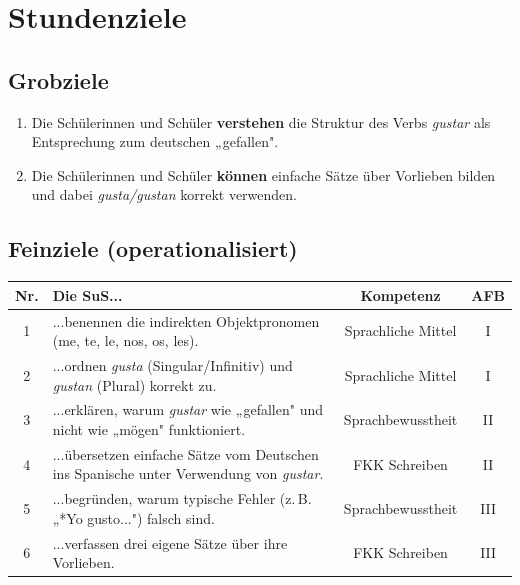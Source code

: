 \documentclass[11pt, a4paper]{article}
\newcommand{\es}[1]{\textcolor{spanisch}{\textit{#1}}}
\begin{document}

\section{Stundenziele}

\subsection{Grobziele}

\begin{enumerate}[leftmargin=2em]
    \item Die Schülerinnen und Schüler \textbf{verstehen} die Struktur des Verbs \es{gustar} als Entsprechung zum deutschen „gefallen".
    \item Die Schülerinnen und Schüler \textbf{können} einfache Sätze über Vorlieben bilden und dabei \es{gusta/gustan} korrekt verwenden.
\end{enumerate}

\subsection{Feinziele (operationalisiert)}

\begin{center}
\small
\begin{tabularx}{\textwidth}{|c|X|c|c|}
    \hline
    \textbf{Nr.} & \textbf{Die SuS...} & \textbf{Kompetenz} & \textbf{AFB} \\
    \hline
    1 & ...benennen die indirekten Objektpronomen (me, te, le, nos, os, les). & Sprachliche Mittel & I \\
    \hline
    2 & ...ordnen \es{gusta} (Singular/Infinitiv) und \es{gustan} (Plural) korrekt zu. & Sprachliche Mittel & I \\
    \hline
    3 & ...erklären, warum \es{gustar} wie „gefallen" und nicht wie „mögen" funktioniert. & Sprachbewusstheit & II \\
    \hline
    4 & ...übersetzen einfache Sätze vom Deutschen ins Spanische unter Verwendung von \es{gustar}. & FKK Schreiben & II \\
    \hline
    5 & ...begründen, warum typische Fehler (z.\,B. „*Yo gusto...") falsch sind. & Sprachbewusstheit & III \\
    \hline
    6 & ...verfassen drei eigene Sätze über ihre Vorlieben. & FKK Schreiben & III \\
    \hline
\end{tabularx}
\end{center}
\end{document}
